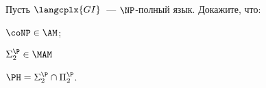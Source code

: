 Пусть $\langcplx{GI}$~--- $\NP$-полный язык. Докажите, что:
\begin{enumcyr}
    \item $\coNP \in \AM$;
    \item $\Sigma^{\P}_2 \in \MAM$
    \item $\PH = \Sigma^{\P}_2 \cap \Pi^{\P}_2$.
\end{enumcyr}